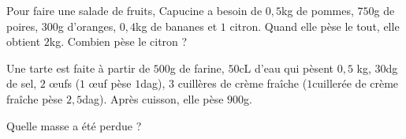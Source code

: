 \documentclass[a4paper,10pt]{report}
\begin{document}
\begin{ex}
Pour faire une salade de fruits, Capucine a besoin de $0,5$kg de pommes, $750$g de poires, $300$g d'oranges, $0,4$kg de bananes et $1$ citron. Quand elle pèse le tout, elle obtient $2$kg. Combien pèse le citron ?
\end{ex}

\begin{ex}
Une tarte est faite à partir de $500$g de farine, $50$cL d'eau qui pèsent $0,5$ kg, $30$dg de sel, $2$ œufs ($1$ œuf pèse $1$dag), $3$ cuillères de crème fraîche ($1$cuillerée de crème fraîche pèse $2,5$dag). Après cuisson, elle pèse $900$g.

\medskip
\noindent Quelle masse a été perdue ?
\end{ex}
\end{document}
